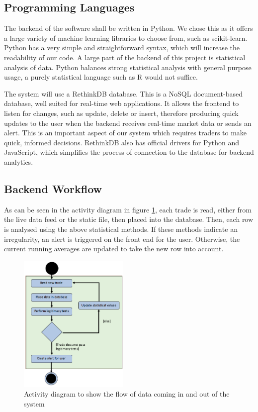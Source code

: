 \documentclass[11pt, oneside, a4paper]{article}
\begin{document}
\subsection{Programming Languages}

The backend of the software shall be written in Python. We chose this as it offers
a large variety of machine learning libraries to choose from, such as
scikit-learn. Python has a very simple and straightforward syntax, which will
increase the readability of our code. A large part of the backend of this project
is statistical analysis of data. Python balances strong statistical analysis with
general purpose usage, a purely statistical language such as R would not suffice.

The system will use a RethinkDB database. This is a NoSQL document-based database,
well suited for real-time web applications. It allows the frontend to listen for
changes, such as update, delete or insert, therefore producing quick updates to
the user when the backend receives real-time market data or sends an alert. This
is an important aspect of our system which requires traders to make quick, informed
decisions. RethinkDB also has official drivers for Python and JavaScript, which
simplifies the process of connection to the database for backend analytics.

\subsection{Backend Workflow}

As can be seen in the activity diagram in figure \ref{ActivityDiagram},
each trade is read, either from the live data feed or the static file, then placed
into the database. Then, each row is analysed using the above statistical methods.
If these methods indicate an irregularity, an alert is triggered on the front end
for the user. Otherwise, the current running averages are updated to take the new
row into account.

\begin{figure}[h]
	\centering
		\includegraphics[width=200px]{ActivityDiagram.png}
	\caption{Activity diagram to show the flow of data coming in and out of the system}
	\label{ActivityDiagram}
\end{figure}
\end{document}
